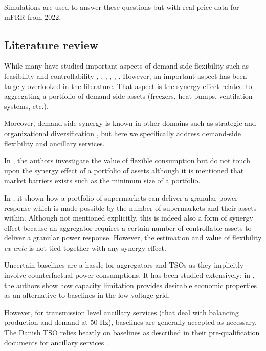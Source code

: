 \documentclass[lettersize,journal]{IEEEtran}
\begin{document}
Simulations are used to answer these questions but with real price data for mFRR from 2022.

\IEEEpubidadjcol

\subsection{Literature review}

While many have studied important aspects of demand-side flexibility such as feasibility and controllability \cite{bondy2018redefining}, \cite{bondy2017performance}, \cite{bondy2016procedure}, \cite{bondy2014performance}, \cite{biegel2014integration}, \cite{AchievingControllabilityofElectricLoads}. However, an important aspect has been largely overlooked in the literature. That aspect is the synergy effect related to aggregating a portfolio of demand-side assets (freezers, heat pumps, ventilation systems, etc.).

Moreover, demand-side synergy is known in other domains such as strategic and organizational diversification \cite{ye2012achieving}, but here we specifically address demand-side flexibility and ancillary services.

In \cite{biegel2014value}, the authors investigate the value of flexible consumption but do not touch upon the synergy effect of a portfolio of assets although it is mentioned that market barriers exists such as the minimum size of a portfolio.

In \cite{pedersen2014aggregation}, it shown how a portfolio of supermarkets can deliver a granular power response which is made possible by the number of supermarkets and their assets within. Although not mentioned explicitly, this is indeed also a form of synergy effect because an aggregator requires a certain number of controllable assets to deliver a granular power response. However, the estimation and value of flexibility \textit{ex-ante} is not tied together with any synergy effect.

Uncertain baselines are a hassle for aggregators and TSOs \cite{ziras2021baselines} as they implicitly involve counterfactual power consumptions. It has been studied extensively: in \cite{capacity_limitation_services}, the authors show how capacity limitation provides desirable economic properties as an alternative to baselines in the low-voltage grid.

However, for transmission level ancillary services (that deal with balancing production and demand at 50 Hz), baselines are generally accepted as necessary. The Danish TSO relies heavily on baselines as described in their pre-qualification documents for ancillary services \cite{energinet:prequalification}.
\end{document}
